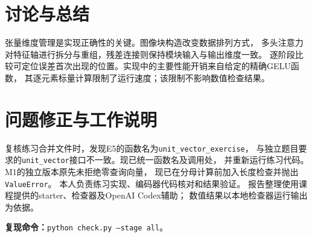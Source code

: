 \documentclass[a4paper,11pt]{ctexart}
\begin{document}
\section{讨论与总结}
张量维度管理是实现正确性的关键。图像块构造改变数据排列方式，
多头注意力对特征轴进行拆分与重组，残差连接则保持模块输入与输出维度一致。
逐阶段比较可定位误差首次出现的位置。实现中的主要性能开销来自给定的精确GELU函数，
其逐元素标量计算限制了运行速度；该限制不影响数值检查结果。

\section{问题修正与工作说明}
复核练习合并文件时，发现E5的函数名为\texttt{unit\_vector\_exercise}，
与独立题目要求的\texttt{unit\_vector}接口不一致。现已统一函数名及调用处，
并重新运行练习代码。M1的独立版本原先未拒绝零查询向量，
现已在分母计算前加入长度检查并抛出\texttt{ValueError}。
本人负责练习实现、编码器代码核对和结果验证。
报告整理使用课程提供的starter、检查器及OpenAI Codex辅助；
数值结果以本地检查器运行输出为依据。

\vfill
\noindent\textbf{复现命令：}\texttt{python check.py --stage all}。
\end{document}
